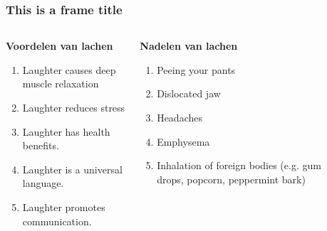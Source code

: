 \documentclass{beamer}
\begin{document}
\begin{frame}
  \frametitle{This is a frame title}
  \begin{columns}[onlytextwidth]
    \begin{column}{0.5\textwidth}
      \centering
			\textbf{Voordelen van lachen}
					
					\begin{enumerate}
						\item Laughter causes deep muscle relaxation
						\item Laughter reduces stress
						\item Laughter has health benefits. 
						\item Laughter is a universal language.
						\item Laughter promotes communication.
					\end{enumerate}
    \end{column}
    \begin{column}{0.5\textwidth}
		\textbf{Nadelen van lachen}
      \centering
					\begin{enumerate}
						\item Peeing your pants 
						\item Dislocated jaw
						\item Headaches
						\item Emphysema
						\item Inhalation of foreign bodies (e.g. gum drops, popcorn, peppermint bark)
					\end{enumerate}
    \end{column}
​  \end{columns}
\end{frame}
\end{document}
